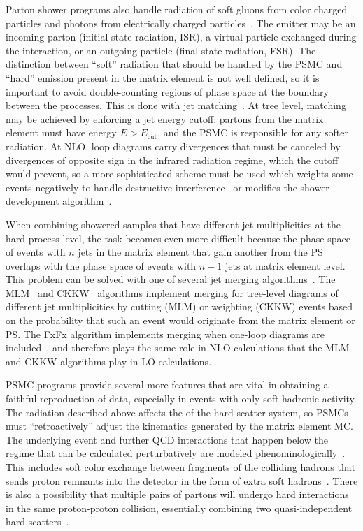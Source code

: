 Parton shower programs also handle radiation of soft gluons from color charged particles and photons from electrically charged particles~\cite{Sjostrand:2004ef}.
The emitter may be an incoming parton (initial state radiation, ISR), a virtual particle exchanged during the interaction, or an outgoing particle (final state radiation, FSR).
The distinction between ``soft'' radiation that should be handled by the PSMC and ``hard'' emission present in the matrix element is not well defined, so it is important to avoid double-counting regions of phase space at the boundary between the processes.
This is done with jet matching~\cite{Alwall:2014hca,Olive:2016xmw}.
At tree level, matching may be achieved by enforcing a jet energy cutoff: partons from the matrix element must have energy $E > E_\text{cut}$, and the PSMC is responsible for any softer radiation.
At NLO, loop diagrams carry divergences that must be canceled by divergences of opposite sign in the infrared radiation regime, which the cutoff would prevent, so a more sophisticated scheme must be used which weights some events negatively to handle destructive interference~\cite{Alwall:2014hca} or modifies the shower development algorithm~\cite{Nason:2004rx,Frixione:2007vw}.

When combining showered samples that have different jet multiplicities at the hard process level, the task becomes even more difficult because the phase space of events with $n$ jets in the matrix element that gain another from the PS overlaps with the phase space of events with $n+1$ jets at matrix element level.
This problem can be solved with one of several jet merging algorithms~\cite{Alwall:2007fs,Alwall:2008qv,Alwall:2014hca,Rauch:2016pai}.
The MLM~\cite{Mangano:2006rw} and CKKW~\cite{Catani:2001cc} algorithms implement merging for tree-level diagrams of different jet multiplicities by cutting (MLM) or weighting (CKKW) events based on the probability that such an event would originate from the matrix element or PS\@.
The FxFx algorithm implements merging when one-loop diagrams are included~\cite{Frederix:2012ps}, and therefore plays the same role in NLO calculations that the MLM and CKKW algorithms play in LO calculations.

PSMC programs provide several more features that are vital in obtaining a faithful reproduction of data, especially in events with only soft hadronic activity.
The radiation described above affects the {\pt} of the hard scatter system, so PSMCs must ``retroactively'' adjust the kinematics generated by the matrix element MC\@.
The underlying event and further QCD interactions that happen below the regime that can be calculated perturbatively are modeled phenominologically~\cite{Olive:2016xmw,Sjostrand:2014zea}.
This includes soft color exchange between fragments of the colliding hadrons that sends proton remnants into the detector in the form of extra soft hadrons~\cite{Sjostrand:2004pf}.
There is also a possibility that multiple pairs of partons will undergo hard interactions in the same proton-proton collision, essentially combining two quasi-independent hard scatters~\cite{Sjostrand:2004ef,Manohar:2012jr}.


